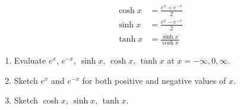 \documentclass[12pt]{article}
\begin{document}
\begin{enumerate}
  \begin{align*}
    \cosh x &=  \frac{e^x+e^{-x}}{2}\\
    \sinh x &=  \frac{e^x-e^{-x}}{2}\\
    \tanh x &=  \frac{\sinh x}{\cosh x}
  \end{align*}

  \begin{enumerate}\item
    Evaluate $e^x$, $e^{-x}$, $\sinh x$, $\cosh x$, $\tanh x$ at $x = -\infty, 0, \infty$.

    \item    Sketch $e^x$ and $e^{-x}$ for both positive and negative values of $x$.


\item    Sketch $\cosh x$, $\sinh x$, $\tanh x$.



\end{enumerate}
\end{enumerate}
\end{document}
